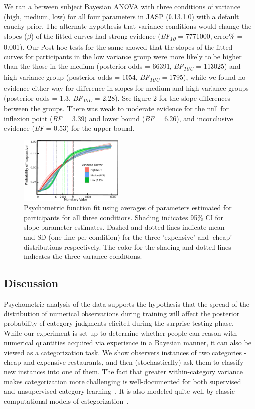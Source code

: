 \documentclass[10pt,letterpaper]{article}
\begin{document}
We ran a between subject Bayesian ANOVA with three conditions of variance (high, medium, low) for all four parameters in JASP (0.13.1.0) with a default cauchy prior. The alternate hypothesis that variance conditions would change the slopes ($\beta$) of the fitted curves had strong evidence (\textit{BF\textsubscript{10}} = 7771000, error\% = 0.001). Our Post-hoc tests for the same showed that the slopes of the fitted curves for participants in the low variance group were more likely to be higher than the those in the medium (posterior odds = 66391,  \textit{BF\textsubscript{10U}} = 113025) and high variance group (posterior odds = 1054,  \textit{BF\textsubscript{10U}} = 1795), while we found no evidence either way for difference in slopes for medium and high variance groups (posterior odds = 1.3,  \textit{BF\textsubscript{10U}} = 2.28). See figure 2 for the slope differences between the groups. There was weak to moderate evidence for the null for inflexion point (\textit{BF} = 3.39) and lower bound (\textit{BF} = 6.26), and inconclusive evidence (\textit{BF} = 0.53) for the upper bound.


\begin{figure}[h!]
    \centering
    \includegraphics[width=0.45\textwidth]{results/slope.pdf}
    \caption{Psychometric function fit using averages of parameters estimated for participants for all three conditions. Shading indicates 95\% CI for slope parameter estimates. Dashed and dotted lines indicate mean and SD (one line per condition) for the three 'expensive' and 'cheap' distributions respectively. The color for the shading and dotted lines indicates the three variance conditions.}
    \label{fig:my_label}
\end{figure}

\subsection{Discussion}

Psychometric analysis of the data supports the hypothesis that the spread of the distribution of numerical observations during training will affect the posterior probability of category judgments elicited during the surprise testing phase. While our experiment is set up to determine whether people can reason with numerical quantities acquired via experience in a Bayesian manner, it can also be viewed as a categorization task. We show observers instances of two categories - cheap and expensive restaurants, and then (stochastically) ask them to classify new instances into one of them. The fact that greater within-category variance makes categorization more challenging is well-documented for both supervised~\cite{alfonso2002makes} and unsupervised category learning~\cite{kloos2008s}. It is also modeled quite well by classic computational models of categorization~\cite{fried1984induction, anderson1991adaptive}. 
\end{document}
